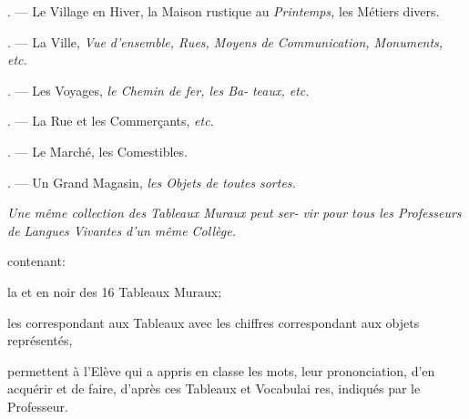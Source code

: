 \begin{VUpage}[112]{}
{\fontsize{8.5pt}{10.2pt}\selectfont
{}. --- Le Village en Hiver, la Maison rustique au\nl
\textit{Printemps,} les Métiers divers.

. --- La Ville, \textit{Vue d'ensemble, Rues, Moyens de}\nl
\textit{Communication, Monuments, etc.}

. --- Les Voyages, \textit{le Chemin de fer, les Ba-}\nl
\textit{teaux, etc.}

. --- La Rue et les Commerçants, \textit{etc.}

. --- Le Marché, les Comestibles.

. --- Un Grand Magasin, \textit{les Objets de toutes}\nl
\textit{sortes.}

\VUblancAlinea
\textit{Une même collection des Tableaux Muraux peut ser-}\nl
\textit{vir pour tous les Professeurs de Langues Vivantes}\nl
\textit{d'un même Collège.}}

\VUsaut{6.0mm}
\VUsaut{3.0mm}
\VUsaut{2.2mm}
\VUsaut{3.0mm}

{\fontsize{8.5pt}{10.2pt}\selectfont
\noindent contenant:

\VUblancAlinea
la  et en noir des 16 Tableaux\nl
Muraux;

\VUblancAlinea
les  correspondant\nl
aux Tableaux avec les chiffres correspondant aux objets\nl
représentés,

\VUblancAlinea
permettent à l'Elève qui a appris en classe les mots,\nl
leur prononciation, d'en acquérir \cc
{} et de faire, d'après ces Tableaux et Vocabulai\cc
res,  indiqués par le Professeur.

\VUblancAlinea
{}\nl
{}}
\end{VUpage}

